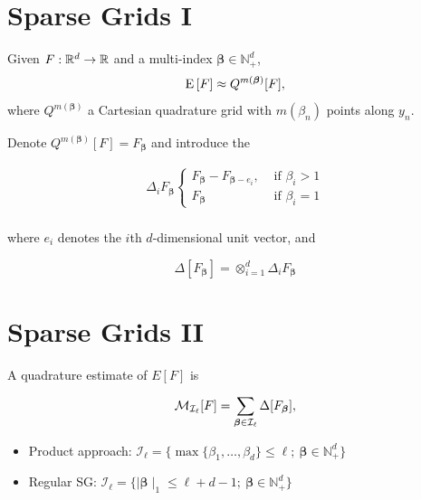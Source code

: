 \documentclass[ima, 20pt, portrait, plainboxedsections]{sciposter}
\begin{document}
\begin{multicols}{3}
\section*{Sparse Grids I}
\textbf{} Given  $F: \mathbb{R}^d \rightarrow \mathbb{R}$ and a multi-index $\boldsymbol{\beta} \in \mathbb{N}^d_{+}$, 
\begin{displaymath} \mathrm{E}\left[F\right] \approx Q^{m(\boldsymbol{\beta})}[F], \end{displaymath} 
where $Q^{m(\boldsymbol{\beta})}$ a Cartesian quadrature grid with $m(\beta_n)$ points along $y_n$.

\textbf{} Denote $Q^{m(\boldsymbol{\beta})}[F]=F_{\boldsymbol{\beta}}$ and introduce the  

\begin{equation}
\begin{aligned}
\Delta_i F_{\boldsymbol{\beta}} \left\{ \begin{array}{rcr}
F_{\boldsymbol{\beta}} - F_{\boldsymbol{\beta}-e_i}, & \text{ if } \beta_i>1  \\ 
F_{\boldsymbol{\beta}}  & \text{ if } \beta_i=1  \end{array} \right. \\
\end{aligned}
\end{equation}

where $e_i$ denotes the $i$th $d$-dimensional unit vector, and 

\begin{equation}
\Delta [F_{\boldsymbol{\beta}}]= \otimes_{i = 1}^{d} \Delta_iF_{\boldsymbol{\beta}}
\end{equation}
\section*{Sparse Grids II}
A quadrature estimate of $E[F]$ is
\begin{small}
\begin{equation}\label{eq:Quadrature_estimator}
\mathcal{M}_{\mathcal{I_{\ell}}}[F]=\sum_{\boldsymbol{\beta} \in \mathcal{I}_{\ell}} \Delta [F_{\boldsymbol{\beta}}],
\end{equation}
\end{small}
\begin{itemize}
\item Product approach: $\mathcal{I}_{\ell}=\{ \max\{\beta_1,\dots,\beta_d \} \le \ell;\: \boldsymbol{\beta} \in \mathbb{N}^d_{+} \} $
\item Regular SG: $ \mathcal{I}_{\ell}=\{  \mid \boldsymbol{\beta} \mid_1 \le \ell+d-1; \: \boldsymbol{\beta} \in \mathbb{N}^d_{+} \} $


\end{itemize}
\end{multicols}
\end{document}
